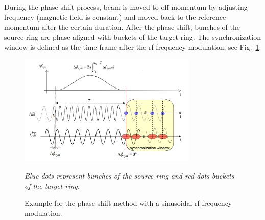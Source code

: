 During the phase shift process, beam is moved to off-momentum by adjusting frequency (magnetic field is constant) and moved back to the reference momentum after the certain duration. After the phase shift, bunches of the source ring are phase aligned with buckets of the target ring. The synchronization window is defined as the time frame after the rf frequency modulation, see Fig.~\ref{phase_shift}.
\begin{figure}[!htb]
   \centering   
   \includegraphics*[width=85mm]{phase_shift.png}
   \caption{Example for the phase shift method with a sinusoidal rf frequency modulation.}{\textsl{\small{Blue dots represent bunches of the source ring and red dots buckets of the target ring.}}}
   \label{phase_shift}
\end{figure} 

